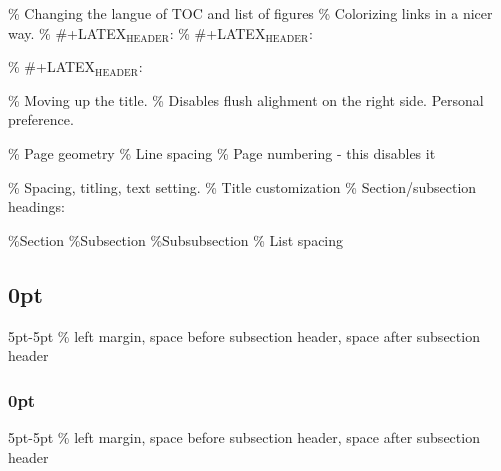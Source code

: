 \documentclass[letterpaper, 11pt]{article}
\author{brun0}
\date{\today}
\title{}
\begin{document}
\tableofcontents

\% Changing the langue of TOC and list of figures
\% Colorizing links in a nicer way.
\% \#+LATEX\(_{\text{HEADER}}\): 
\% \#+LATEX\(_{\text{HEADER}}\): \usepackage[colorlinks]{hyperref}
\% \#+LATEX\(_{\text{HEADER}}\): \hypersetup{colorlinks, linkcolor=blue, urlcolor=bblue}

\% Moving up the title.
\% Disables flush alighment on the right side. Personal preference.

\% Page geometry
\% Line spacing
\% Page numbering - this disables it

\% Spacing, titling, text setting.
\% Title customization
\% Section/subsection headings:

\%Section
\%Subsection
\%Subsubsection
\% List spacing
\titlespacing\subsection{0pt}{5pt}{-5pt} \% left margin, space before subsection header, space after subsection header

\titlespacing\subsubsection{0pt}{5pt}{-5pt} \% left margin, space before subsection header, space after subsection header
\end{document}
